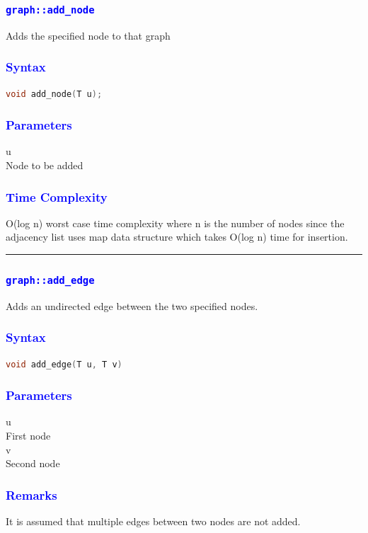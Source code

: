 \documentclass[11pt,a4paper]{article}
\begin{document}
\subsubsection*{\textcolor{blue}{ \Large \texttt{graph::add\_node}}}
Adds the specified node to that graph
\subsubsection*{\textcolor{blue}{ \large {Syntax}}}
\begin{lstlisting}[language=C++]
 void add_node(T u);
\end{lstlisting}
\subsubsection*{\textcolor{blue}{ \large {Parameters}}}
u\\
Node to be added
\subsubsection*{\textcolor{blue}{ \large {Time Complexity}}}
O(log n) worst case time complexity where n is the number of nodes since the adjacency list uses map data structure which takes O(log n) time for insertion.
\\
\rule{17cm}{0.1mm}



\subsubsection*{\textcolor{blue}{ \Large \texttt{graph::add\_edge
}}}
Adds an undirected edge between the two specified nodes.

\subsubsection*{\textcolor{blue}{ \large {Syntax}}}
\begin{lstlisting}[language=C++]
 void add_edge(T u, T v)

\end{lstlisting}
\subsubsection*{\textcolor{blue}{ \large {Parameters}}}
u\\
First node\\
v\\
Second node
\subsubsection*{\textcolor{blue}{ \large {Remarks}}}
It is assumed that multiple edges between two nodes are not added.
\end{document}
